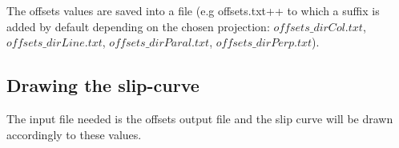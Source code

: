 The offsets values are saved into a file (e.g \verb++offsets.txt++ to which a suffix is added by default depending on the chosen projection: $offsets\_dirCol.txt$,  $offsets\_dirLine.txt$, $offsets\_dirParal.txt$, $offsets\_dirPerp.txt$).

\subsection{Drawing the slip-curve}
The input file needed is the offsets output file and the slip curve will be drawn accordingly to these values.




